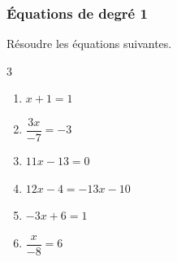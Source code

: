 {\subsubsection*{Équations de degré 1}
\begin{Exercice}
Résoudre les équations suivantes.
\leavevmode\vspace{-\baselineskip}
\begin{multicols}{3}
\begin{enumerate}[itemsep=1em]
	\item \begin{minipage}[t]{\linewidth}$x+1=1$\end{minipage}
	\item \begin{minipage}[t]{\linewidth}$\dfrac{3x}{-7}=-3$\end{minipage}
	\item \begin{minipage}[t]{\linewidth}$11x-13=0$\end{minipage}
	\item \begin{minipage}[t]{\linewidth}$12x-4=-13x-10$\end{minipage}
	\item \begin{minipage}[t]{\linewidth}$-3x+6=1$\end{minipage}
	\item \begin{minipage}[t]{\linewidth}$\dfrac{x}{-8}=6$\end{minipage}
\end{enumerate}
\end{multicols}
\end{Exercice}

}
